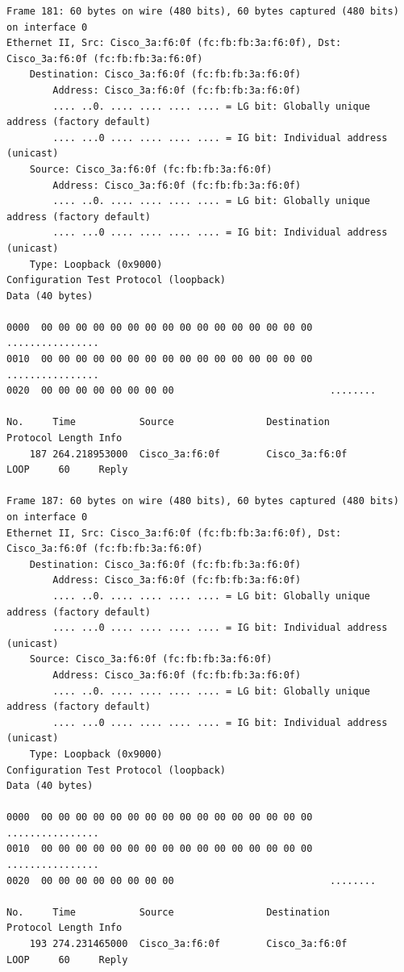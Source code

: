 \documentclass[a4paper,11pt]{article}
\begin{document}
\begin{lstlisting}
Frame 181: 60 bytes on wire (480 bits), 60 bytes captured (480 bits) on interface 0
Ethernet II, Src: Cisco_3a:f6:0f (fc:fb:fb:3a:f6:0f), Dst: Cisco_3a:f6:0f (fc:fb:fb:3a:f6:0f)
    Destination: Cisco_3a:f6:0f (fc:fb:fb:3a:f6:0f)
        Address: Cisco_3a:f6:0f (fc:fb:fb:3a:f6:0f)
        .... ..0. .... .... .... .... = LG bit: Globally unique address (factory default)
        .... ...0 .... .... .... .... = IG bit: Individual address (unicast)
    Source: Cisco_3a:f6:0f (fc:fb:fb:3a:f6:0f)
        Address: Cisco_3a:f6:0f (fc:fb:fb:3a:f6:0f)
        .... ..0. .... .... .... .... = LG bit: Globally unique address (factory default)
        .... ...0 .... .... .... .... = IG bit: Individual address (unicast)
    Type: Loopback (0x9000)
Configuration Test Protocol (loopback)
Data (40 bytes)

0000  00 00 00 00 00 00 00 00 00 00 00 00 00 00 00 00   ................
0010  00 00 00 00 00 00 00 00 00 00 00 00 00 00 00 00   ................
0020  00 00 00 00 00 00 00 00                           ........

No.     Time           Source                Destination           Protocol Length Info
    187 264.218953000  Cisco_3a:f6:0f        Cisco_3a:f6:0f        LOOP     60     Reply

Frame 187: 60 bytes on wire (480 bits), 60 bytes captured (480 bits) on interface 0
Ethernet II, Src: Cisco_3a:f6:0f (fc:fb:fb:3a:f6:0f), Dst: Cisco_3a:f6:0f (fc:fb:fb:3a:f6:0f)
    Destination: Cisco_3a:f6:0f (fc:fb:fb:3a:f6:0f)
        Address: Cisco_3a:f6:0f (fc:fb:fb:3a:f6:0f)
        .... ..0. .... .... .... .... = LG bit: Globally unique address (factory default)
        .... ...0 .... .... .... .... = IG bit: Individual address (unicast)
    Source: Cisco_3a:f6:0f (fc:fb:fb:3a:f6:0f)
        Address: Cisco_3a:f6:0f (fc:fb:fb:3a:f6:0f)
        .... ..0. .... .... .... .... = LG bit: Globally unique address (factory default)
        .... ...0 .... .... .... .... = IG bit: Individual address (unicast)
    Type: Loopback (0x9000)
Configuration Test Protocol (loopback)
Data (40 bytes)

0000  00 00 00 00 00 00 00 00 00 00 00 00 00 00 00 00   ................
0010  00 00 00 00 00 00 00 00 00 00 00 00 00 00 00 00   ................
0020  00 00 00 00 00 00 00 00                           ........

No.     Time           Source                Destination           Protocol Length Info
    193 274.231465000  Cisco_3a:f6:0f        Cisco_3a:f6:0f        LOOP     60     Reply


\end{lstlisting}
\end{document}
